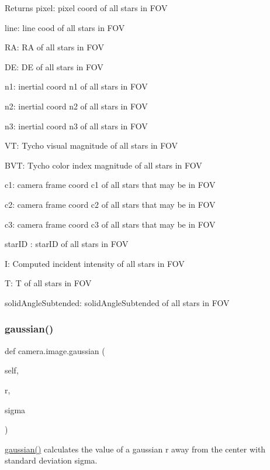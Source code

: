 \begin{DoxyReturn}{Returns}
pixel\+: pixel coord of all stars in F\+OV 

line\+: line cood of all stars in F\+OV 

RA\+: RA of all stars in F\+OV 

DE\+: DE of all stars in F\+OV 

n1\+: inertial coord n1 of all stars in F\+OV 

n2\+: inertial coord n2 of all stars in F\+OV 

n3\+: inertial coord n3 of all stars in F\+OV 

VT\+: Tycho visual magnitude of all stars in F\+OV 

B\+VT\+: Tycho color index magnitude of all stars in F\+OV 

c1\+: camera frame coord c1 of all stars that may be in F\+OV 

c2\+: camera frame coord c2 of all stars that may be in F\+OV 

c3\+: camera frame coord c3 of all stars that may be in F\+OV 

star\+ID \+: star\+ID of all stars in F\+OV 

I\+: Computed incident intensity of all stars in F\+OV 

T\+: T of all stars in F\+OV 

solid\+Angle\+Subtended\textquotesingle{}\+: solid\+Angle\+Subtended of all stars in F\+OV 
\end{DoxyReturn}
\mbox{\label{classcamera_1_1image_a8221ae614b180710c72f2675838939b2}} 
\subsubsection{\texorpdfstring{gaussian()}{gaussian()}}
{\footnotesize\ttfamily def camera.\+image.\+gaussian (\begin{DoxyParamCaption}\item[{}]{self,  }\item[{}]{r,  }\item[{}]{sigma }\end{DoxyParamCaption})}



\hyperlink{classcamera_1_1image_a8221ae614b180710c72f2675838939b2}{gaussian()} calculates the value of a gaussian r away from the center with standard deviation sigma. 

